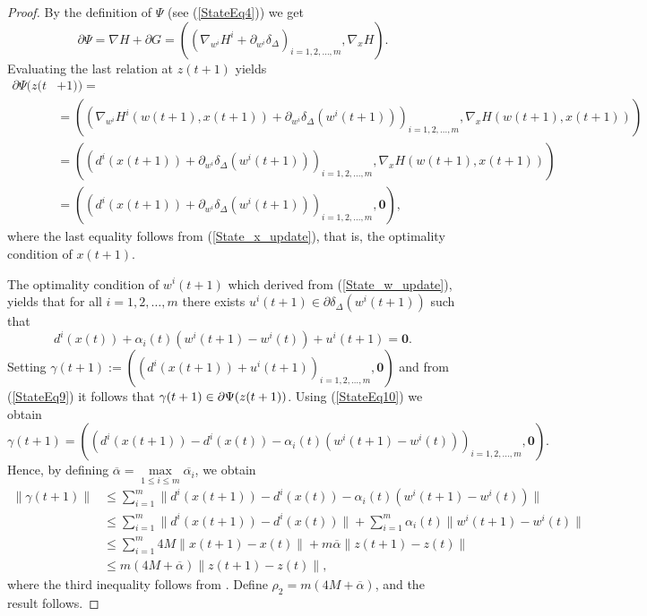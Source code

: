\documentclass[11pt]{article}
\numberwithin{equation}{section}
\begin{document}
\begin{proof}
By the definition of $\Psi$ (see (\ref{StateEq4})) we get
\begin{equation*}
	\partial \Psi = \nabla H + \partial G  
= \left( \left( \nabla_{w^i} H^i + \partial_{w^i} \delta_{\Delta} \right)_{i=1,2, \ldots ,m} , \nabla_x H \right) .
\end{equation*}
Evaluating the last relation at $z(t+1)$ yields
\begin{align}
	\partial \Psi(z(t & + 1)) = \\
	& = \left( \left( \nabla_{w^i} H^i(w(t+1),x(t+1)) + \partial_{w^i} \delta_{\Delta}(w^i(t+1)) \right)_{i=1,2, \ldots ,m} , \nabla_x H(w(t+1),x(t+1)) \right) \\
	& = \left( \left( d^i(x(t+1)) + \partial_{w^i} \delta_{\Delta}(w^i(t+1)) \right)_{i=1,2, \ldots ,m} , \nabla_x H(w(t+1),x(t+1)) \right) \\
	& = \left( \left( d^i(x(t+1)) + \partial_{w^i} \delta_{\Delta}(w^i(t+1)) \right)_{i=1,2, \ldots ,m} , \mathbf{0} \right) , \label{StateEq9}
\end{align}
where the last equality follows from (\ref{State_x_update}), that is, the optimality condition of $x(t+1)$.

The optimality condition of $w^i(t+1)$ which derived from (\ref{State_w_update}), yields that for all $i=1, 2, \ldots ,m$ there exists $u^i(t+1) \in \partial \delta_{\Delta}(w^i(t+1))$ such that
\begin{equation}
	d^i(x(t)) + \alpha_i(t) \left( w^i(t+1) - w^i(t) \right) + u^i(t+1) = \mathbf{0} . \label{StateEq10}
\end{equation}
Setting $\gamma(t+1) := \left( \left( d^i(x(t+1)) + u^i(t+1) \right)_{i=1,2, \ldots ,m}, \mathbf{0} \right)$ and from (\ref{StateEq9}) it follows that $\gamma(t+1) \in \\ \partial \Psi(z(t+1))$. Using (\ref{StateEq10}) we obtain
\begin{equation*}
	\gamma(t+1) = \left( \left( d^i(x(t+1)) - d^i(x(t)) - \alpha_i(t)(w^i(t+1) - w^i(t)) \right)_{i=1,2, \ldots, m}, \mathbf{0} \right).
\end{equation*}
Hence, by defining $\overline{\alpha} = \max\limits_{1 \leq i \leq m} \overline{\alpha_i}$, we obtain
\begin{align*}
	\| \gamma(t+1) \|
	& \leq \sum\limits_{i=1}^{m} \| d^i(x(t+1)) - d^i(x(t)) - \alpha_i(t) \left( w^i(t+1) - w^i(t) \right) \| \\
	& \leq \sum\limits_{i=1}^{m} \| d^i(x(t+1)) - d^i(x(t)) \| + \sum\limits_{i=1}^{m} \alpha_i(t) \| w^i(t+1) - w^i(t) \| \\
	& \leq \sum\limits_{i=1}^{m} 4M \| x(t+1) - x(t) \| + m \overline{\alpha} \|z(t+1) - z(t)\| \\
	& \leq m \left( 4M + \overline{\alpha} \right) \|z(t+1) - z(t)\| , 
\end{align*}
where the third inequality follows from . Define $\rho_2 = m \left( 4M + \overline{\alpha} \right)$, and the result follows.
\end{proof}
\end{document}
